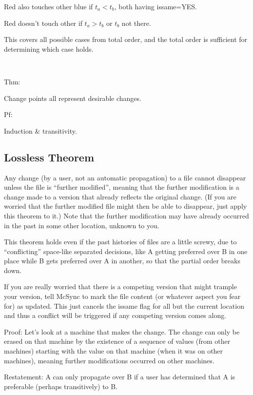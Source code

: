 \documentclass{book}
\begin{document}
Red also touches other blue if $t_a < t_b$, both having issame=YES.

Red doesn't touch other if $t_a > t_b$ or $t_b$ not there.

This covers all possible cases from total order, and the total order is sufficient for determining which case holds.

~

Thm:

Change points all represent desirable changes.

Pf:

Induction \& transitivity.




\subsection{Lossless Theorem}

Any change (by a user, not an automatic propagation) to a file cannot disappear unless the file is ``further modified'', meaning that the further modification is a change made to a version that already reflects the original change.  (If you are worried that the further modified file might then be able to disappear, just apply this theorem to it.)  Note that the further modification may have already occurred in the past in some other location, unknown to you.

This theorem holds even if the past histories of files are a little screwy, due to ``conflicting'' space-like separated decisions, like A getting preferred over B in one place while B gets preferred over A in another, so that the partial order breaks down.

If you are really worried that there is a competing version that might trample your version, tell McSync to mark the file content (or whatever aspect you fear for) as updated.  This just cancels the issame flag for all but the current location and thus a conflict will be triggered if any competing version comes along.

Proof:  Let's look at a machine that makes the change.  The change can only be erased on that machine by the existence of a sequence of values (from other machines) starting with the value on that machine (when it was on other machines), meaning further modifications occurred on other machines.

Restatement:  A can only propagate over B if a user has determined that A is preferable (perhaps transitively) to B.
\end{document}
